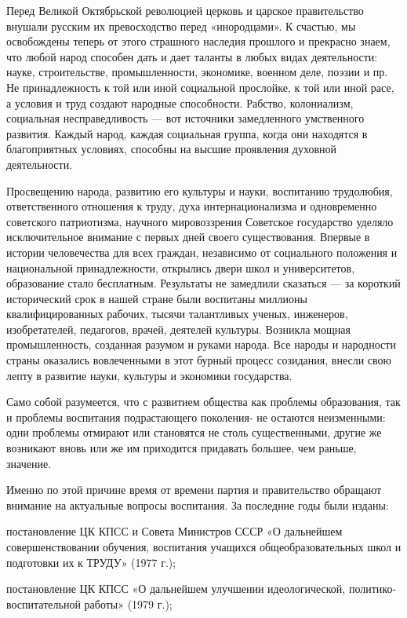 \documentclass[12pt, a4paper, openany]{book}
\begin{document}
Перед Великой Октябрьской революцией церковь и  царское правительство внушали русским их превосходство  перед «инородцами». К счастью, мы освобождены теперь от этого страшного наследия прошлого и прекрасно знаем, что любой народ способен дать и дает таланты в любых видах деятельности: науке, строительстве, промышленности,  экономике, военном деле, поэзии и пр. Не принадлежность к той или иной социальной прослойке, к той или иной расе, а условия и труд создают народные способности. Рабство, колониализм, социальная несправедливость — вот  источники замедленного умственного развития. Каждый народ, каждая социальная группа, когда они находятся в  благоприятных условиях, способны на высшие проявления  духовной деятельности. 

Просвещению народа, развитию его культуры и науки, воспитанию трудолюбия, ответственного отношения к  труду, духа интернационализма и одновременно советского патриотизма, научного мировоззрения Советское  государство уделяло исключительное внимание с первых дней своего существования. Впервые в истории человечества для всех граждан, независимо от социального положения и  национальной принадлежности, открылись двери школ и  университетов, образование стало бесплатным. Результаты не замедлили сказаться — за короткий исторический срок в нашей стране были воспитаны миллионы  квалифицированных рабочих, тысячи талантливых ученых, инженеров, изобретателей, педагогов, врачей, деятелей культуры. Возникла мощная промышленность, созданная разумом и руками народа. Все народы и народности страны  оказались вовлеченными в этот бурный процесс созидания, внесли свою лепту в развитие науки, культуры и экономики государства. 

Само собой разумеется, что с развитием общества как проблемы образования, так и проблемы воспитания  подрастающего поколения- не остаются неизменными: одни проблемы отмирают или становятся не столь существенными, другие же возникают вновь или же им приходится придавать большее, чем раньше, значение. 

Именно по этой причине время от времени партия и  правительство обращают внимание на актуальные вопросы воспитания. За последние годы были изданы: 

постановление ЦК КПСС и Совета Министров СССР «О дальнейшем совершенствовании обучения, воспитания учащихся общеобразовательных школ и подготовки их к ТРУДУ» (1977 г.); 

постановление ЦК КПСС «О дальнейшем улучшении идеологической, политико-воспитательной работы» (1979 г.); 
\end{document}
